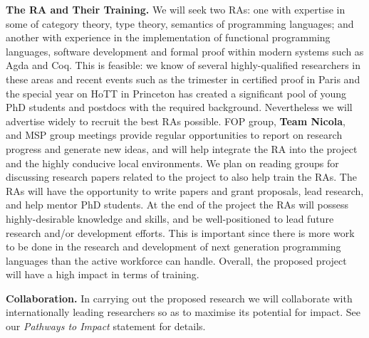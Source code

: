 \documentclass[a4paper,11pt]{article}
\begin{document}
{\bf The RA and Their Training.} We will seek two RAs: one with
expertise in some of category theory, type theory, semantics of
programming languages; and another with experience in the
implementation of functional programming languages, software
development and formal proof within modern systems such as Agda and
Coq. This is feasible: we know of several highly-qualified researchers
in these areas and recent events such as the trimester in certified
proof in Paris and the special year on HoTT in Princeton has created a
significant pool of young PhD students and postdocs with the required
background. Nevertheless we will advertise widely to recruit the best RAs
possible. %
FOP group, {\bf Team Nicola}, and MSP group meetings
provide regular opportunities to report on research 
progress and generate new ideas, and will help integrate the RA into
the project and the highly conducive local environments.
We plan on reading groups for discussing research
papers 
related to the project to also help train the RAs. The RAs will have
the opportunity to write papers and grant proposals, lead research,
and help mentor PhD students.  At the end of the project the RAs will
possess highly-desirable knowledge and skills, and be well-positioned
to lead future research and/or development efforts. This is important
since there is more work to be done in the research and development of
next generation programming languages than the active workforce can
handle. Overall, the proposed project will have a high impact in terms
of training.

\vspace*{0.02in}

{\bf Collaboration.} In carrying out the proposed research we will
collaborate with internationally leading researchers so as to maximise
its potential for impact. See our {\em Pathways to
  Impact} statement for details.

\end{document}
